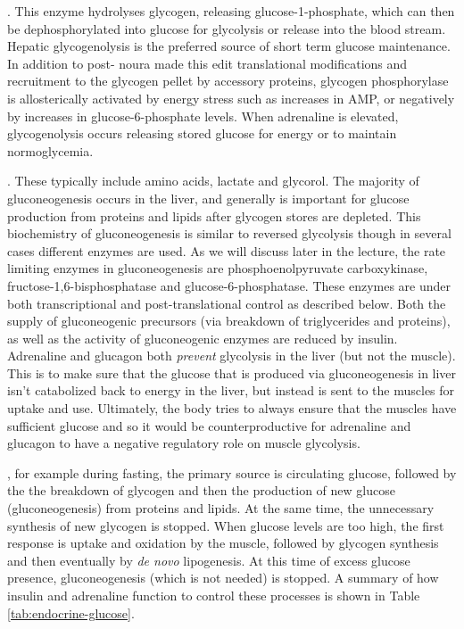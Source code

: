 \documentclass{tufte-handout}
\begin{document}
.  This enzyme hydrolyses glycogen, releasing glucose-1-phosphate, which can then be dephosphorylated into glucose for glycolysis or release into the blood stream.  Hepatic glycogenolysis is the preferred source of short term glucose maintenance.  In addition to post- noura made this edit translational modifications and recruitment to the glycogen pellet by accessory proteins, glycogen phosphorylase is allosterically activated by energy stress such as increases in AMP, or negatively by increases in glucose-6-phosphate levels.  When adrenaline is elevated, glycogenolysis occurs releasing stored glucose for energy or to maintain normoglycemia.

.  These typically include amino acids, lactate and glycorol.  The majority of gluconeogenesis occurs in the liver, and generally is important for glucose production from proteins and lipids after glycogen stores are depleted.  This biochemistry of gluconeogenesis is similar to reversed glycolysis though in several cases different enzymes are used.  As we will discuss later in the lecture, the rate limiting enzymes in gluconeogenesis are phosphoenolpyruvate carboxykinase, fructose-1,6-bisphosphatase and glucose-6-phosphatase.  These enzymes are under both transcriptional and post-translational control as described below.  Both the supply of gluconeogenic precursors (via breakdown of triglycerides and proteins), as well as the activity of gluconeogenic enzymes are reduced by insulin.  Adrenaline and glucagon both \emph{prevent} glycolysis in the liver (but not the muscle).  This is to make sure that the glucose that is produced via gluconeogenesis in liver isn't catabolized back to energy in the liver, but instead is sent to the muscles for uptake and use. Ultimately, the body tries to always ensure that the muscles have sufficient glucose and so it would be counterproductive for adrenaline and glucagon to have a negative regulatory role on muscle glycolysis.

, for example during fasting, the primary source is circulating glucose, followed by the the breakdown of glycogen and then the production of new glucose (gluconeogenesis) from proteins and lipids.  At the same time, the unnecessary synthesis of new glycogen is stopped.  When glucose levels are too high, the first response is uptake and oxidation by the muscle, followed by glycogen synthesis and then eventually by \textit{de novo} lipogenesis.  At this time of excess glucose presence, gluconeogenesis (which is not needed) is stopped.  A summary of how insulin and adrenaline function to control these processes is shown in Table \ref{tab:endocrine-glucose}.
\end{document}
